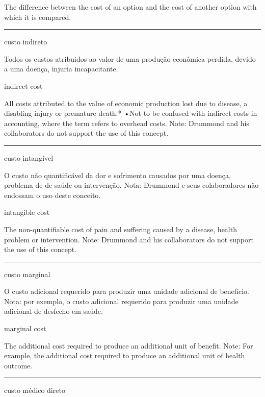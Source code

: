 \documentclass[
  openany]{book}
\begin{document}
The difference between the cost of an option and the cost of another option with which it is compared.

\begin{center}\rule{0.5\linewidth}{0.5pt}\end{center}

custo indireto

Todos os custos atribuidos ao valor de uma produção econômica perdida, devido a uma doença, injuria incapacitante.

indirect cost

All costs attributed to the value of economic production lost due to disease, a disabling injury or premature death.* •Not to be confused with indirect costs in accounting, where the term refers to overhead costs. Note: Drummond and his collaborators do not support the use of this concept.

\begin{center}\rule{0.5\linewidth}{0.5pt}\end{center}

custo intangível

O custo não quantificável da dor e sofrimento causados por uma doença, problema de de saúde ou intervenção. Nota: Drummond e seus colaboradores não endossam o uso deste conceito.

intangible cost

The non-quantifiable cost of pain and suffering caused by a disease, health problem or intervention. Note: Drummond and his collaborators do not support the use of this concept.

\begin{center}\rule{0.5\linewidth}{0.5pt}\end{center}

custo marginal

O custo adicional requerido para produzir uma unidade adicional de benefício. Nota: por exemplo, o custo adicional requerido para produzir uma unidade adicional de desfecho em saúde.

marginal cost

The additional cost required to produce an additional unit of benefit. Note: For example, the additional cost required to produce an additional unit of health outcome.

\begin{center}\rule{0.5\linewidth}{0.5pt}\end{center}

custo médico direto
\end{document}
